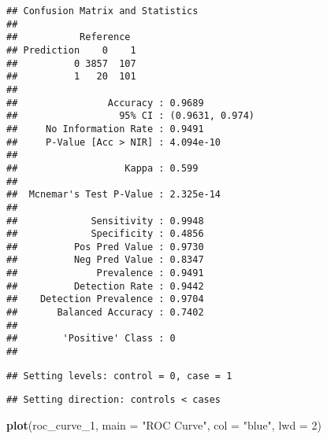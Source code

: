 \documentclass[
]{article}
\newenvironment{Shaded}{\begin{snugshade}}{\end{snugshade}}
\newcommand{\AttributeTok}[1]{\textcolor[rgb]{0.13,0.29,0.53}{#1}}
\newcommand{\CommentTok}[1]{\textcolor[rgb]{0.56,0.35,0.01}{\textit{#1}}}
\newcommand{\DecValTok}[1]{\textcolor[rgb]{0.00,0.00,0.81}{#1}}
\newcommand{\FunctionTok}[1]{\textcolor[rgb]{0.13,0.29,0.53}{\textbf{#1}}}
\newcommand{\NormalTok}[1]{#1}
\newcommand{\OtherTok}[1]{\textcolor[rgb]{0.56,0.35,0.01}{#1}}
\newcommand{\SpecialCharTok}[1]{\textcolor[rgb]{0.81,0.36,0.00}{\textbf{#1}}}
\newcommand{\StringTok}[1]{\textcolor[rgb]{0.31,0.60,0.02}{#1}}
\begin{document}
\begin{verbatim}
## Confusion Matrix and Statistics
## 
##           Reference
## Prediction    0    1
##          0 3857  107
##          1   20  101
##                                          
##                Accuracy : 0.9689         
##                  95% CI : (0.9631, 0.974)
##     No Information Rate : 0.9491         
##     P-Value [Acc > NIR] : 4.094e-10      
##                                          
##                   Kappa : 0.599          
##                                          
##  Mcnemar's Test P-Value : 2.325e-14      
##                                          
##             Sensitivity : 0.9948         
##             Specificity : 0.4856         
##          Pos Pred Value : 0.9730         
##          Neg Pred Value : 0.8347         
##              Prevalence : 0.9491         
##          Detection Rate : 0.9442         
##    Detection Prevalence : 0.9704         
##       Balanced Accuracy : 0.7402         
##                                          
##        'Positive' Class : 0              
## 
\end{verbatim}

\begin{Shaded}
\end{Shaded}

\begin{verbatim}
## Setting levels: control = 0, case = 1
\end{verbatim}

\begin{verbatim}
## Setting direction: controls < cases
\end{verbatim}

\begin{Shaded}
\begin{Highlighting}[]
\FunctionTok{plot}\NormalTok{(roc\_curve\_1, }\AttributeTok{main =} \StringTok{"ROC Curve"}\NormalTok{, }\AttributeTok{col =} \StringTok{"blue"}\NormalTok{, }\AttributeTok{lwd =} \DecValTok{2}\NormalTok{)}
\end{Highlighting}
\end{Shaded}
\end{document}
